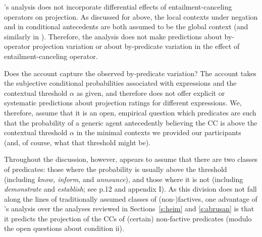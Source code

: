 \documentclass[a4paper,12pt,twoside]{article}
\newcommand{\poscite}[1]{\citeauthor{#1}'s \citeyear{#1}}
\begin{document}
    \poscite{schlenker_triggering_2021} analysis does not incorporate differential effects of entailment-canceling operators on projection. As discussed for \citealt{heim_projection_1983} above, the local contexts under negation and in conditional antecedents are both assumed to be the global context (and similarly in \citealt{schlenker_local_2009}). Therefore, the analysis does not make predictions about by-operator projection variation or about by-predicate variation in the effect of entailment-canceling operator.

    Does the account capture the observed by-predicate variation?
    The account takes the subjective conditional probabilities associated with expressions and the contextual threshold $\alpha$ as given, and therefore does not offer explicit or systematic predictions about projection ratings for different expressions.
    We, therefore, assume that it is an open, empirical question which predicates are such that the probability of a generic agent antecedently believing the CC is above the contextual threshold $\alpha$ in the minimal contexts we provided our participants (and, of course, what that threshold might be).
    
    Throughout the discussion, however, \citealt{schlenker_triggering_2021} appears to assume that there are two classes of predicates: those where the probability is usually above the threshold (including {\em know, inform}, and {\em announce}), and those where it is not (including {\em demonstrate} and {\em establish}; see p.12 and appendix I).
    As this division does not fall along the lines of traditionally assumed classes of (non-)factives,
    one advantage of \poscite{schlenker_triggering_2021} analysis over the analyses reviewed in Sections~\ref{s:heim} and \ref{s:abrusan} is that it predicts the projection of the CCs of (certain) non-factive predicates (modulo the open questions about condition ii).
\end{document}
